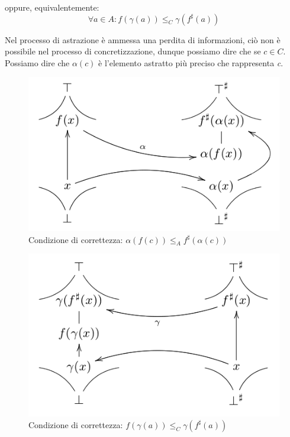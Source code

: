 \documentclass[a4paper, 11pt]{report}
\begin{document}
	\noindent
	oppure, equivalentemente:
	\begin{equation*}
	\forall a\in A: f(\gamma(a))\leq_C \gamma(f^{\sharp}(a))
	\end{equation*}
	
	Nel processo di astrazione è ammessa una perdita di informazioni, ciò non è possibile nel processo di concretizzazione, dunque possiamo dire che se $c\in C$. Possiamo  dire che $\alpha(c)$ è l'elemento astratto più preciso che rappresenta \textit{c}.
	
	\begin{multicols}{2}	
		\begin{figure}[H]
			\centering
			\includegraphics[scale=0.35]{Correttezza}
			\caption{Condizione di correttezza: $\alpha(f(c))\leq_A f^{\sharp}(\alpha(c))$}
			\label{Correct}
		\end{figure}
		\columnbreak
		\begin{figure}[H]
			\centering
			\includegraphics[scale=0.35]{CorrettezzaAstr}
			\caption{Condizione di correttezza: $f(\gamma(a))\leq_C \gamma(f^{\sharp}(a))$}
			\label{CorrectAbstr}
		\end{figure}
	\end{multicols}
	
\end{document}
